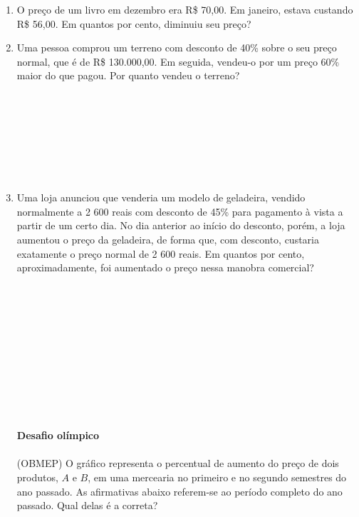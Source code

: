 \documentclass[a4paper,14pt]{article}
\begin{document}
\begin{multicols}{2}
\begin{enumerate}
			\item O preço de um livro em dezembro era R\$ 70,00. Em janeiro, estava custando R\$ 56,00. Em quantos por cento, diminuiu seu preço? \newpage
			\item Uma pessoa comprou um terreno com desconto de 40\% sobre o seu preço normal, que é de R\$ 130.000,00. Em seguida, vendeu-o por um preço 60\% maior do que pagou. Por quanto vendeu o terreno? \\\\\\\\\\\\\\\\
			\item Uma loja anunciou que venderia um modelo de geladeira, vendido normalmente a 2 600 reais com desconto de 45\% para pagamento à vista a partir de um certo dia. No dia anterior ao início do desconto, porém, a loja aumentou o preço da geladeira, de forma que, com desconto, custaria exatamente o preço normal de 2 600 reais. Em quantos por cento, aproximadamente, foi aumentado o preço nessa manobra comercial? \\\\\\\\\\\\\\\\\\\\\\\\
			\textbf{Desafio olímpico} \\\\
			(OBMEP) O gráfico representa o percentual de aumento do preço de dois produtos, $A$ e $B$, em uma mercearia no primeiro e no segundo semestres do ano passado. As afirmativas abaixo referem-se ao período completo do ano passado. Qual delas é a correta? \\

\end{enumerate}
\end{multicols}
\end{document}
